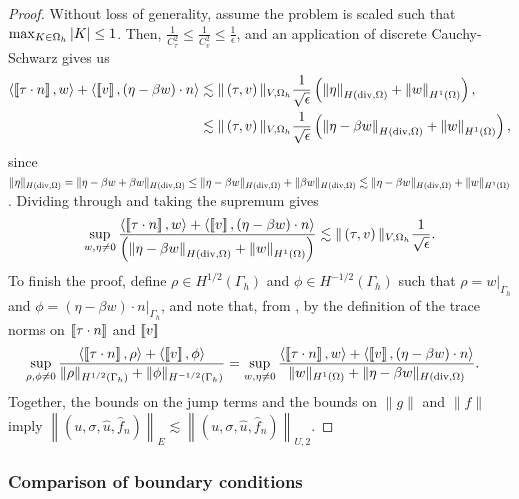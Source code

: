 \begin{proof}
Without loss of generality, assume the problem is scaled such that $\max_{K\in\Oh}|K| \leq 1$. Then, $\frac{1}{C_\tau^2}\leq \frac{1}{C_v^2} \leq \frac{1}{\epsilon}$, and an application of discrete Cauchy-Schwarz gives us 
\begin{align*}
\langle \jump{\tau\cdot n},w\rangle + \langle \jump{v},\left(\eta - \beta w\right)\cdot n\rangle &\lesssim \|\left(\tau,v\right)\|_{V,\Oh}\frac{1}{\sqrt{\epsilon}}\left(\nor{\eta}_{H({\rm div},\Omega)} + \nor{w}_{H^1(\Omega)}\right),\\
&\lesssim \|\left(\tau,v\right)\|_{V,\Oh}\frac{1}{\sqrt{\epsilon}}\left(\nor{\eta-\beta w}_{H({\rm div},\Omega)} + \nor{w}_{H^1(\Omega)}\right),
\end{align*}
since $\|\eta\|_{H({\rm div},\Omega)} = \|\eta - \beta w + \beta w\|_{H({\rm div},\Omega)} \leq \|\eta - \beta w\|_{H({\rm div},\Omega)} + \|\beta w\|_{H({\rm div},\Omega)} \lesssim \|\eta-\beta w\|_{H({\rm div},\Omega)} + \|w\|_{H^1(\Omega)}$.  Dividing through and taking the supremum gives
\[
\sup_{w,\eta \neq 0} \frac{\langle\jump{\tau\cdot n},w\rangle + \langle \jump{v},\left(\eta - \beta w\right)\cdot n\rangle}{\left(\nor{\eta-\beta w}_{H({\rm div},\Omega)} + \nor{w}_{H^1(\Omega)}\right)} \lesssim \|\left(\tau,v\right)\|_{V,\Oh}\frac{1}{\sqrt{\epsilon}}.
\]
To finish the proof, define $\rho \in H^{1/2}(\Gamma_h)$ and $\phi \in H^{-1/2}(\Gamma_h)$ such that $\rho = \left.w\right|_{\Gamma_h}$ and $\phi = \left.(\eta-\beta w)\cdot n\right|_{\Gamma_h}$, and note that, from \cite{analysisDPG}, by the definition of the trace norms on $\jump{\tau\cdot n}$ and $\jump{v}$ 
\begin{align*}
\sup_{\rho,\phi \neq 0} \frac{\langle \jump{\tau\cdot n},\rho\rangle + \langle \jump{v},\phi \rangle}{\|\rho\|_{H^{1/2}(\Gamma_h)}+\|\phi\|_{H^{-1/2}(\Gamma_h)}} &= \sup_{w,\eta \neq 0} \frac{\langle \jump{\tau\cdot n},w\rangle + \langle \jump{v},\left(\eta - \beta w\right)\cdot n\rangle}{ \|w\|_{H^1(\Omega)}+\|\eta-\beta w\|_{H({\rm div},\Omega)}}.
\end{align*}
Together, the bounds on the jump terms and the bounds on $\|g\|$ and $\|f\|$ imply $\left\|\left(u,\sigma,\widehat{u},\widehat{f}_n\right)\right\|_{E} \lesssim \left\|\left(u,\sigma,\widehat{u},\widehat{f}_n\right)\right\|_{U,2}$.
\end{proof}

\subsubsection{Comparison of boundary conditions}

